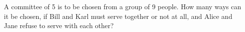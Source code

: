 A committee of 5 is to be chosen from a group of 9 people. How many ways can it be chosen, if Bill and Karl must serve together or not at all, and Alice and Jane refuse to serve with each other?